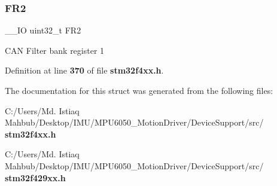 \mbox{\label{structCAN__FilterRegister__TypeDef_a7f7d80b45b7574463d7030fc8a464582}} 
\subsubsection{F\+R2}
{\footnotesize\ttfamily \+\_\+\+\_\+\+IO uint32\+\_\+t F\+R2}

C\+AN Filter bank register 1 

Definition at line \textbf{ 370} of file \textbf{ stm32f4xx.\+h}.



The documentation for this struct was generated from the following files\+:\begin{DoxyCompactItemize}
\item 
C\+:/\+Users/\+Md. Istiaq Mahbub/\+Desktop/\+I\+M\+U/\+M\+P\+U6050\+\_\+\+Motion\+Driver/\+Device\+Support/src/\textbf{ stm32f4xx.\+h}\item 
C\+:/\+Users/\+Md. Istiaq Mahbub/\+Desktop/\+I\+M\+U/\+M\+P\+U6050\+\_\+\+Motion\+Driver/\+Device\+Support/src/\textbf{ stm32f429xx.\+h}\end{DoxyCompactItemize}
